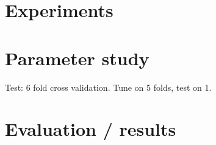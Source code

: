 \documentclass[thesis.tex]{subfiles}
\begin{document}
\section{Experiments}
%
%
\section{Parameter study}



Test: 6 fold cross validation.
Tune on 5 folds, test on 1.
%
\section{Evaluation / results}
%

%
\subbibliography
\end{document}
